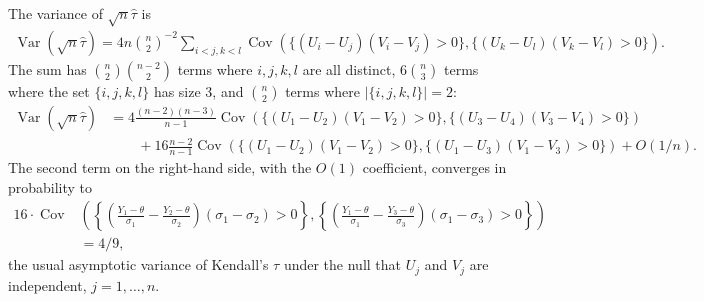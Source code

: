 \documentclass[12pt]{article}
\renewcommand{\P}{P}
\newcommand{\y}{Y}
\renewcommand{\u}{U}
\renewcommand{\v}{V}
\newcommand{\thetahat}{\hat{\theta}}
\newcommand{\h}[2]{\{(\u_{#1}-\u_{#2})(\v_{#1}-\v_{#2})>0\}}
\DeclareMathOperator{\E}{E}
\DeclareMathOperator{\V}{Var}
\DeclareMathOperator{\Cov}{Cov}
\newcommand{\comment}[1]{
  \iftoggle{commenttoggle}{
    {\normalsize{\color{red}{ #1}}\normalsize}
  }
  {}
}
\begin{document}
  The variance of $\sqrt{n}\hat\tau$ is 
    \begin{align}
      \V(\sqrt{n}\hat\tau)=4n{n\choose 2}^{-2}\sum_{i<j,k<l}\Cov(\h{i}{j},\h{k}{l}).
    \end{align}%
    The sum has ${n\choose 2}{n-2\choose 2}$ terms where $i,j,k,l$ are
    all distinct, $6{n\choose 3}$ terms where the set
    $\{i,j,k,l\}$ has size 3, and ${n\choose 2}$ terms where
    $|\{i,j,k,l\}|=2$:
    \begin{align}
      \V(\sqrt{n}\hat\tau)&=4\frac{(n-2)(n-3)}{n-1}\Cov(\h{1}{2},\h{3}{4})\\
      &\hspace{2em}+16\frac{n-2}{n-1}\Cov(\h{1}{2},\h{1}{3}) + O(1/n).
    \end{align}    
     The second term on the right-hand side, with the $O(1)$ coefficient, converges in probability to
    \begin{align}
    16\cdot\Cov&\left(\left\{\left(\frac{\y_1-\theta}{\sigma_1}
          -\frac{\y_2-\theta}{\sigma_2}\right)(\sigma_1-\sigma_2)>0\right\} ,
                 \left\{\left(\frac{\y_1-\theta}{\sigma_1}-\frac{\y_3-\theta}{\sigma_3}\right)(\sigma_1-\sigma_3)>0\right\}\right)\\
      &=4/9,
    \end{align}
    the usual asymptotic variance of
    Kendall's $\tau$ under the  null that $U_j$ and $V_j$ are independent, $j=1,\ldots,n.$
\end{document}
